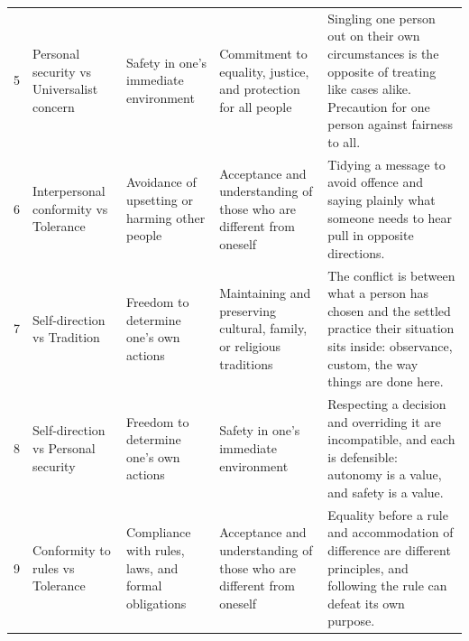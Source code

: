 {\begin{tabular}{@{}rp{3.0cm}p{3.3cm}p{3.3cm}p{5.6cm}@{}}
5 & {\raggedright Personal security vs Universalist concern\par} & {\raggedright Safety in one's immediate environment\par} & {\raggedright Commitment to equality, justice, and protection for all people\par} & {\raggedright Singling one person out on their own circumstances is the opposite of treating like cases alike. Precaution for one person against fairness to all.\par} \\
6 & {\raggedright Interpersonal conformity vs Tolerance\par} & {\raggedright Avoidance of upsetting or harming other people\par} & {\raggedright Acceptance and understanding of those who are different from oneself\par} & {\raggedright Tidying a message to avoid offence and saying plainly what someone needs to hear pull in opposite directions.\par} \\
7 & {\raggedright Self-direction vs Tradition\par} & {\raggedright Freedom to determine one's own actions\par} & {\raggedright Maintaining and preserving cultural, family, or religious traditions\par} & {\raggedright The conflict is between what a person has chosen and the settled practice their situation sits inside: observance, custom, the way things are done here.\par} \\
8 & {\raggedright Self-direction vs Personal security\par} & {\raggedright Freedom to determine one's own actions\par} & {\raggedright Safety in one's immediate environment\par} & {\raggedright Respecting a decision and overriding it are incompatible, and each is defensible: autonomy is a value, and safety is a value.\par} \\
9 & {\raggedright Conformity to rules vs Tolerance\par} & {\raggedright Compliance with rules, laws, and formal obligations\par} & {\raggedright Acceptance and understanding of those who are different from oneself\par} & {\raggedright Equality before a rule and accommodation of difference are different principles, and following the rule can defeat its own purpose.\par} \\

\end{tabular}}
